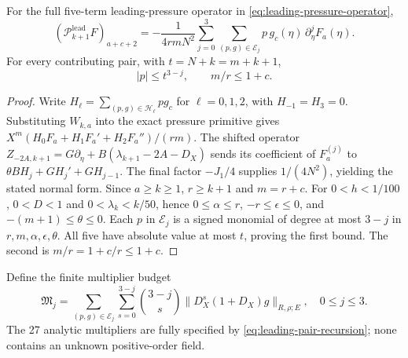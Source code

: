 \begin{proposition}
\label{prop:leading-all-jets}
For the full five-term leading-pressure operator in
\eqref{eq:leading-pressure-operator},
\begin{equation}\label{eq:complete-leading-normalform}
(\mathcal P_{k+1}^{\mathrm{lead}}F)_{a+c+2}
=-\frac1{4rmN^2}
\sum_{j=0}^3\sum_{(p,g)\in\mathcal E_j}
p\,g_c(\eta)\,\partial_\eta^jF_a(\eta).
\end{equation}
For every contributing pair, with $t=N+k=m+k+1$,
\begin{equation}\label{eq:leading-poly-bound}
|p|\le t^{3-j},\qquad m/r\le1+c .
\end{equation}
\end{proposition}
\begin{proof}
Write $H_\ell=\sum_{(p,g)\in\mathcal H_\ell}p g_c$
for $\ell=0,1,2$, with $H_{-1}=H_3=0$. Substituting
$W_{k,a}$ into the exact pressure primitive gives
$X^m(H_0F_a+H_1F_a'+H_2F_a'')/(rm)$.
The shifted operator $Z_{-2A,k+1}=
G\partial_\eta+B(\lambda_{k+1}-2A-D_X)$
sends its coefficient of $F_a^{(j)}$ to
$\theta BH_j+GH_j'+GH_{j-1}$. The final factor $-J_1/4$
supplies $1/(4N^2)$, yielding the stated normal form.
Since $a\ge k\ge1$, $r\ge k+1$ and $m=r+c$.
For $0<h<1/100$, $0<D<1$ and
$0<\lambda_k<k/50$, hence
$0\le\alpha\le r$, $-r\le\epsilon\le0$,
and $-(m+1)\le\theta\le0$.
Each $p$ in $\mathcal E_j$ is a signed monomial of degree
at most $3-j$ in $r,m,\alpha,\epsilon,\theta$.
All five have absolute value at most $t$, proving the first
bound. The second is $m/r=1+c/r\le1+c$.
\end{proof}

Define the finite multiplier budget
\begin{equation}\label{eq:leading-multiplier-budget}
\mathfrak M_j=\sum_{(p,g)\in\mathcal E_j}
\sum_{s=0}^{3-j}\binom{3-j}{s}
\|D_X^s(1+D_X)g\|_{R,\rho;E},\quad0\le j\le3.
\end{equation}
The 27 analytic multipliers are fully specified by
\eqref{eq:leading-pair-recursion}; none contains an unknown positive-order field.

